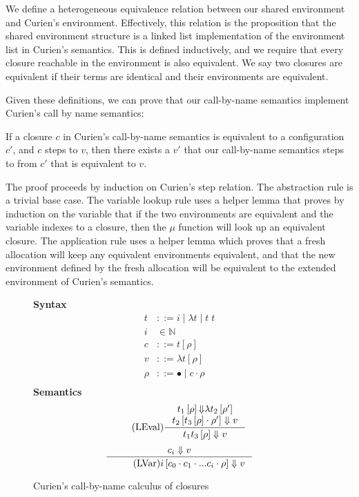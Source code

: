 We define a heterogeneous equivalence relation between our shared environment
and Curien's environment. Effectively, this relation is the proposition that
the shared environment structure is a linked list implementation of the
environment list in Curien's semantics. This is defined inductively, and we
require that every closure reachable in the environment is also equivalent.  We
say two closures are equivalent if their terms are identical and their
environments are equivalent. 

Given these definitions, we can prove that our call-by-name semantics implement
Curien's call by name semantics: 

\begin{theorem}
If a closure $c$ in Curien's call-by-name semantics is equivalent to a
configuration $c'$, and $c$ steps to $v$, then there exists a $v'$ that our
call-by-name semantics steps to from $c'$ that is equivalent to $v$.
\end{theorem}
\begin{proofoutline}
The proof proceeds by induction on Curien's step relation. The abstraction rule
is a trivial base case. The variable lookup rule uses a helper lemma that proves
by induction on the variable that if the two environments are equivalent and the
variable indexes to a closure, then the $\mu$ function will look up an
equivalent closure. The application rule uses a helper lemma which proves that a
fresh allocation will keep any equivalent environments equivalent, and that the
new environment defined by the fresh allocation will be equivalent to the
extended environment of Curien's semantics.
\end{proofoutline}

\begin{figure}
\textbf{Syntax}
\begin{align*}
\tag{Term} t &::= i \; | \; \lambda t \; | \; t \; t  \\
\tag{Variable} i &\in \mathbb{N}  \\
\tag{Closure} c &::= t \left[\rho\right] \\
\tag{Value} v &::= \lambda t \left[\rho\right] \\
\tag{Environment} \rho &::= \bullet \; | \; c \cdot \rho \\
\end{align*}
\textbf{Semantics}
\begin{align*}
\tag{LEval}\inference
{t_1\left[\rho\right] {\Downarrow} \lambda t_2\left[\rho'\right] \\ 
 t_2\left[t_3\left[\rho\right] \cdot \rho'\right] \Downarrow v}
{t_1 t_3\left[\rho\right] \Downarrow v } 
\end{align*}
\begin{align*}
\inference
{c_i \Downarrow v}
{\tag{LVar} i \left[c_0 \cdot c_1 \cdot ... c_i \cdot \rho\right] \Downarrow v}
\end{align*}
\caption{Curien's call-by-name calculus of closures}
\label{fig:curien}
\end{figure}

